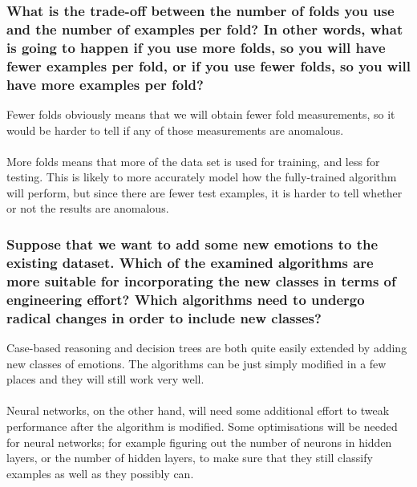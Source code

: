 \documentclass[12pt]{article}
\begin{document}
\subsubsection*{What is the trade-off between the number of folds you use and the number of examples per fold? In other words, what is going to happen if you use more folds, so you will have fewer examples per fold, or if you use fewer folds, so you will have more examples per fold?}

Fewer folds obviously means that we will obtain fewer fold measurements, so it would be harder to tell if any of those measurements are anomalous. \\ \\
More folds means that more of the data set is used for training, and less for testing. This is likely to more accurately model how the fully-trained algorithm will perform, but since there are fewer test examples, it is harder to tell whether or not the results are anomalous.

\subsubsection*{Suppose that we want to add some new emotions to the existing dataset. Which of the examined algorithms are more suitable for incorporating the new classes in terms of engineering effort? Which algorithms need to undergo radical changes in order to include new classes?}

Case-based reasoning and decision trees are both quite easily extended by adding new classes of emotions. The algorithms can be just simply modified in a few places and they will still work very well.\\ \\
Neural networks, on the other hand, will need some additional effort to tweak performance after the algorithm is modified. Some optimisations will be needed for neural networks; for example figuring out the number of neurons in hidden layers, or the number of hidden layers, to make sure that they still classify examples as well as they possibly can.
\end{document}
